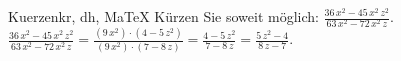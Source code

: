 \begin{MAufgabe}{Kuerzen}{kr, dh, MaTeX}
K\"urzen Sie soweit m\"oglich: $\frac{36\, x^2 - 45\, x^2\, z^2}{63\, x^2 - 72\, x^2\, z}$.\\ 
\ifLsg\MLoesung
\quad $\frac{36\, x^2 - 45\, x^2\, z^2}{63\, x^2 - 72\, x^2\, z}=\frac{(9\, x^2)\cdot(4 - 5\, z^2)}{(9\, x^2)\cdot(7 - 8\, z)}=\frac{4 - 5\, z^2}{7 - 8\, z}=\frac{5\, z^2 - 4}{8\, z - 7}$.\else\relax\fi
 \end{MAufgabe}